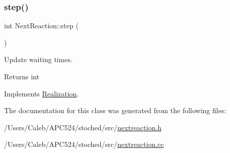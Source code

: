 \subsubsection{\texorpdfstring{step()}{step()}}
{\footnotesize\ttfamily int Next\+Reaction\+::step (\begin{DoxyParamCaption}{ }\end{DoxyParamCaption})\hspace{0.3cm}{\ttfamily [virtual]}}



Update waiting times. 

\begin{DoxyReturn}{Returns}
int 
\end{DoxyReturn}


Implements \hyperlink{class_realization_a9949217117927b149850288f3b74c9ef}{Realization}.



The documentation for this class was generated from the following files\+:\begin{DoxyCompactItemize}
\item 
/\+Users/\+Caleb/\+A\+P\+C524/stoched/src/\hyperlink{nextreaction_8h}{nextreaction.\+h}\item 
/\+Users/\+Caleb/\+A\+P\+C524/stoched/src/\hyperlink{nextreaction_8cc}{nextreaction.\+cc}\end{DoxyCompactItemize}
